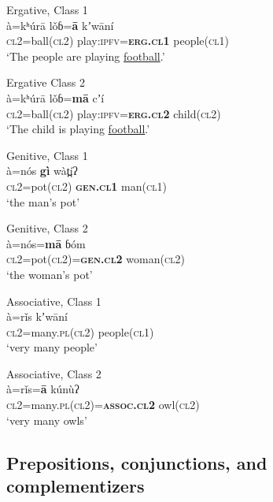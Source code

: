 \documentclass[output=collectionpaper,hidelinks]{langscibook}
\theoremstyle{remark}
\begin{document}
\ea
 Ergative, Class 1 \\
\gll à=kʰúrā lǒɓ=\textbf{ā} kʼwāní \\
 \textsc{cl2}=ball(\textsc{cl2}) play:\textsc{ipfv}=\textbf{\textsc{erg.cl1}} people(\textsc{cl1}) \\
\glt `The people are playing \uline{football}.' \\
\z

\ea
 Ergative Class 2 \\
\gll à=kʰúrā lǒɓ=\textbf{mā} cʼí \\
 \textsc{cl2}=ball(\textsc{cl2}) play:\textsc{ipfv}=\textbf{\textsc{erg.cl2}} child(\textsc{cl2}) \\
\glt `The child is playing \uline{football}.' \\
\z

\ea
 Genitive, Class 1 \\
\gll à=nós \textbf{gì} wàt̪íʔ \\
 \textsc{cl2}=pot(\textsc{cl2}) \textbf{\textsc{gen.cl1}} man(\textsc{cl1}) \\
\glt `the man's pot' \\
\z

\ea
 Genitive, Class 2 \\
\gll à=nós=\textbf{mā} ɓóm \\
 \textsc{cl2}=pot(\textsc{cl2})=\textbf{\textsc{gen.cl2}} woman(\textsc{cl2}) \\
\glt `the woman's pot' \\
\z

\ea
 Associative, Class 1 \\
\gll à=rǐs kʼwāní \\
 \textsc{cl2}=many.\textsc{pl}(\textsc{cl2}) people(\textsc{cl1}) \\
\glt `very many people' \\
\z

\ea
 Associative, Class 2 \\
\gll à=rǐs=\textbf{ā} kúnùʔ \\
 \textsc{cl2}=many.\textsc{pl}(\textsc{cl2})=\textbf{\textsc{assoc.cl2}} owl(\textsc{cl2}) \\
\glt `very many owls' \\
\z


\subsection{Prepositions, conjunctions, and complementizers}
\label{sec:Don:Prepositions_Conjunctions_Complementizers}
\end{document}
